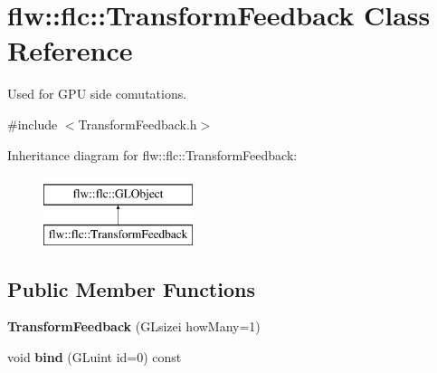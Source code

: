 \hypertarget{classflw_1_1flc_1_1TransformFeedback}{}\section{flw\+:\+:flc\+:\+:Transform\+Feedback Class Reference}
\label{classflw_1_1flc_1_1TransformFeedback}


Used for G\+PU side comutations.  




{\ttfamily \#include $<$Transform\+Feedback.\+h$>$}

Inheritance diagram for flw\+:\+:flc\+:\+:Transform\+Feedback\+:\begin{figure}[H]
\begin{center}
\leavevmode
\includegraphics[height=2.000000cm]{classflw_1_1flc_1_1TransformFeedback}
\end{center}
\end{figure}
\subsection*{Public Member Functions}
\begin{DoxyCompactItemize}
\item 
{\bfseries Transform\+Feedback} (G\+Lsizei how\+Many=1)\hypertarget{classflw_1_1flc_1_1TransformFeedback_aeb7c90098d1d7be731e2c2e1042a20ea}{}\label{classflw_1_1flc_1_1TransformFeedback_aeb7c90098d1d7be731e2c2e1042a20ea}

\item 
void {\bfseries bind} (G\+Luint id=0) const \hypertarget{classflw_1_1flc_1_1TransformFeedback_a963e31feba90ee0072982df35b6a74a7}{}\label{classflw_1_1flc_1_1TransformFeedback_a963e31feba90ee0072982df35b6a74a7}

\end{DoxyCompactItemize}
